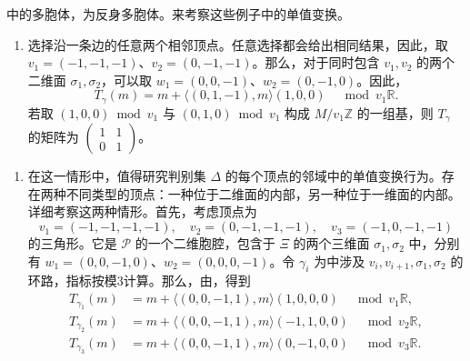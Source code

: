 \begin{example}\label{ex:6.82}
中的多胞体，为反身多胞体。来考察这些例子中的单值变换。
\begin{enumerate}[label=(\arabic*)]
\item 选择沿一条边的任意两个相邻顶点。任意选择都会给出相同结果，因此，取 $v_1=(-1,-1,-1)$、$v_2=(0,-1,-1)$。那么，对于同时包含 $v_1,v_2$ 的两个二维面 $\sigma_1,\sigma_2$，可以取 $w_1=(0,0,-1)$、$w_2=(0,-1,0)$。因此，
\[
T_\gamma(m)=m+\langle(0,1,-1),m\rangle(1,0,0)
\quad\bmod v_1\mathbb R.
\]
若取 $(1,0,0)\bmod v_1$ 与 $(0,1,0)\bmod v_1$ 构成 $M/v_1\mathbb Z$ 的一组基，则 $T_\gamma$ 的矩阵为 $\begin{pmatrix}1&1\\0&1\end{pmatrix}$。
\end{enumerate}

\begin{enumerate}[label=(\arabic*),start=2]
\item 在这一情形中，值得研究判别集 $\Delta$ 的每个顶点的邻域中的单值变换行为。存在两种不同类型的顶点：一种位于二维面的内部，另一种位于一维面的内部。详细考察这两种情形。首先，考虑顶点为
\[
v_1=(-1,-1,-1,-1),\quad
v_2=(0,-1,-1,-1),\quad
v_3=(-1,0,-1,-1)
\]
的三角形。它是 $\mathcal P$ 的一个二维胞腔，包含于 $\Xi$ 的两个三维面 $\sigma_1,\sigma_2$ 中，分别有 $w_1=(0,0,-1,0)$、$w_2=(0,0,0,-1)$。令 $\gamma_i$ 为中涉及 $v_i,v_{i+1},\sigma_1,\sigma_2$ 的环路，指标按模3计算。那么，由，得到
\[
\begin{aligned}
T_{\gamma_1}(m)&=m+\langle(0,0,-1,1),m\rangle(1,0,0,0)
\quad\bmod v_1\mathbb R,\\
T_{\gamma_2}(m)&=m+\langle(0,0,-1,1),m\rangle(-1,1,0,0)
\quad\bmod v_2\mathbb R,\\
T_{\gamma_3}(m)&=m+\langle(0,0,-1,1),m\rangle(0,-1,0,0)
\quad\bmod v_3\mathbb R.
\end{aligned}
\]
\end{enumerate}


\end{example}
